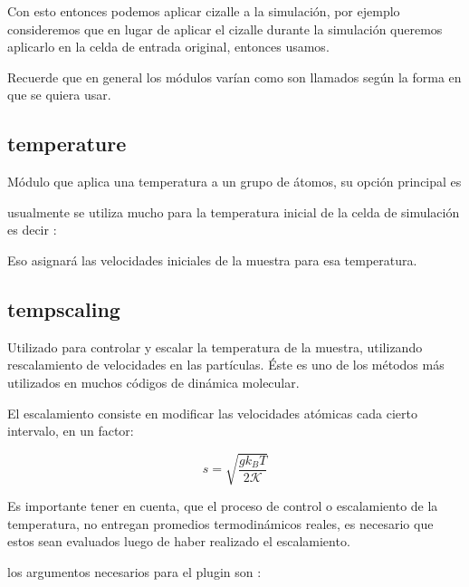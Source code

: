 Con esto entonces podemos aplicar cizalle a la simulaci\'on, por ejemplo consideremos que en lugar de aplicar el cizalle durante la simulaci\'on queremos aplicarlo en la celda de entrada original, entonces usamos.


Recuerde que en general los m\'odulos var\'ian como son llamados seg\'un la forma en que se quiera usar.

\subsection{temperature}
M\'odulo que aplica una temperatura a un grupo de \'atomos, su opci\'on principal es


usualmente se utiliza mucho para la temperatura inicial de la celda de simulaci\'on es decir :


Eso asignar\'a las velocidades iniciales de la muestra para esa temperatura.

\subsection{tempscaling}

Utilizado para controlar y escalar la temperatura de la muestra, utilizando rescalamiento de velocidades en las part\'iculas. \'Este es uno de los m\'etodos m\'as utilizados en muchos c\'odigos de din\'amica molecular.

El escalamiento consiste en modificar las velocidades at\'omicas cada cierto intervalo, en un factor:

$$s=\sqrt{\frac{gk_BT}{2\mathcal{K}}}$$

Es importante tener en cuenta, que el proceso de control o escalamiento de la temperatura, no entregan promedios termodin\'amicos reales, es necesario que estos sean evaluados luego de haber realizado el escalamiento.

los argumentos necesarios para el plugin son :


